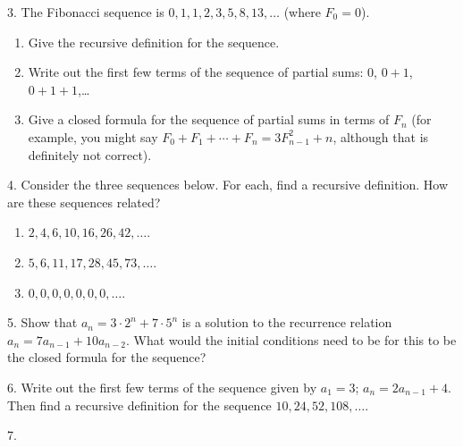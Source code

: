 \documentclass[10pt,]{book}
\theoremstyle{plain}
\theoremstyle{definition}
\numberwithin{equation}{chapter}
\begin{document}
\begin{exerciselist}
\begin{enumerate}[label=(\alph*)]
\end{enumerate}
\par\smallskip
\item[3.]\hypertarget{exercise-142}{}
          The Fibonacci sequence is \(0, 1, 1, 2, 3, 5, 8, 13, \ldots\) (where \(F_0 = 0\)).
\leavevmode%
\begin{enumerate}[label=(\alph*)]
\item\hypertarget{li-495}{}
              Give the recursive definition for the sequence.
\item\hypertarget{li-496}{}
              Write out the first few terms of the sequence of partial sums: \(0\), \(0+1\), \(0+1+1\),\dots{}
\item\hypertarget{li-497}{}
              Give a closed formula for the sequence of partial sums in terms of \(F_n\)\label{notation-1}
 (for example, you might say \(F_0 + F_1 + \cdots + F_n = 3F_{n-1}^2 + n\), although that is definitely not correct).
\end{enumerate}
\par\smallskip
\item[4.]\hypertarget{exercise-143}{}
          Consider the three sequences below. For each, find a recursive definition. How are these sequences related?
\leavevmode%
\begin{enumerate}[label=(\alph*)]
\item\hypertarget{li-501}{}\(2, 4, 6, 10, 16, 26, 42, \ldots\).%
\item\hypertarget{li-502}{}\(5, 6, 11, 17, 28, 45, 73, \ldots\).%
\item\hypertarget{li-503}{}\(0, 0 , 0 , 0 , 0 , 0 , 0 ,\ldots\).%
\end{enumerate}
\par\smallskip
\item[5.]\hypertarget{exercise-144}{}
          Show that \(a_n = 3\cdot 2^n + 7\cdot 5^n\) is a solution to the recurrence relation \(a_n = 7a_{n-1} + 10a_{n-2}\).   What would the initial conditions need to be for this to be the closed formula for the sequence?
\par\smallskip
\item[6.]\hypertarget{exercise-145}{}
          Write out the first few terms of the sequence given by \(a_1 = 3\); \(a_n = 2a_{n-1} + 4\). Then find a recursive definition for the sequence \(10, 24, 52, 108, \ldots\).
\par\smallskip
\item[7.]\hypertarget{exercise-146}{}

\end{exerciselist}
\end{document}

